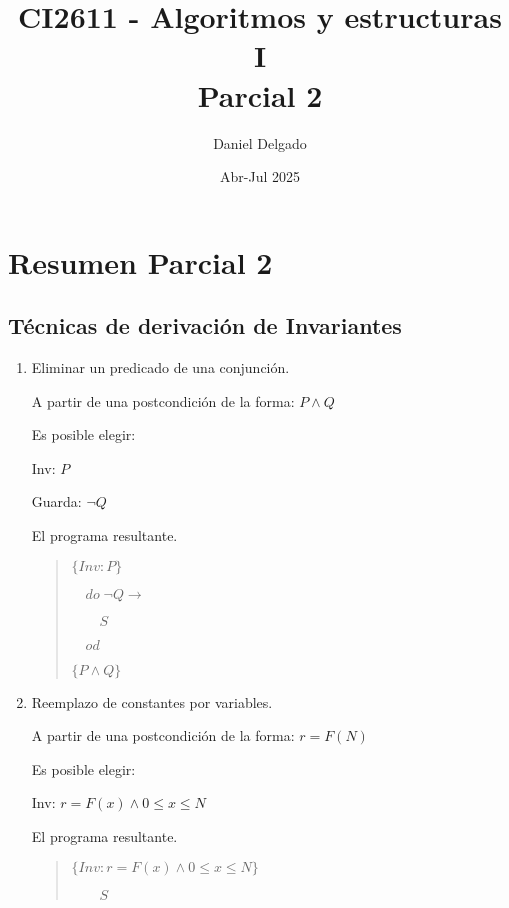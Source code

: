 \documentclass[hidelinks]{article}
\title{CI2611 - Algoritmos y estructuras I \\ Parcial 2 }%
\date{Abr-Jul 2025}
\author{Daniel Delgado}
\newenvironment{absolutelynopagebreak}
{\Needspace{10\baselineskip}\begin{quote}}
		{\end{quote}}
\begin{document}
\maketitle

\tableofcontents

\newpage

\section{Resumen Parcial 2}

\subsection{Técnicas de derivación de Invariantes}\par

\begin{enumerate}
	\item Eliminar un predicado de una conjunción.\par
	      A partir de una postcondición de la forma: $P \land Q$\par
	      Es posible elegir:\par
	      Inv: $P$\par
	      Guarda: $\neg Q$\par
	      El programa resultante.\par
	      \begin{absolutelynopagebreak}
		      $\{Inv: P\}$\par
		      $\quad do \; \neg Q \rightarrow$\par
		      $\qquad S$\par
		      $\quad od$\par
		      $\{P \land Q\}$\par
	      \end{absolutelynopagebreak}
	\item Reemplazo de constantes por variables.\par
	      A partir de una postcondición de la forma: $r = F(N)$\par
	      Es posible elegir:\par
	      Inv: $r = F(x) \land 0 \leq x \leq N$\par
	      El programa resultante.\par
	      \begin{absolutelynopagebreak}
		      $\{Inv: r = F(x) \land 0 \leq x \leq N\}$\par
		      $\qquad S$\par

\end{absolutelynopagebreak}
\end{enumerate}
\end{document}
